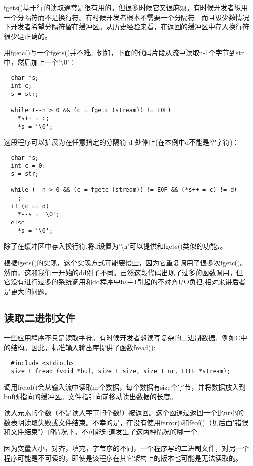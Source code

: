 fgets()基于行的读取通常是很有用的。但很多时候它又很麻烦。有时候开发者想用一个分隔符而不是换行符。有时候开发者根本不需要一个分隔符－而且极少数情况下开发者希望分隔符留在缓冲区。从历史经验来看，在返回的缓冲区中存入换行符很少是正确的。

用fgetc()写一个fgets()并不难。例如，下面的代码片段从流中读取n-1个字节到str中，然后加上一个'\textbackslash0'：
\begin{lstlisting}
  char *s; 
  int c;
  s = str;
  
  while (--n > 0 && (c = fgetc (stream)) != EOF)
    *s++ = c;
    *s = '\0';
\end{lstlisting}

这段程序可以扩展为在任意指定的分隔符 d 处停止(在本例中d不能是空字符)：
\begin{lstlisting}
  char *s;
  int c = 0;
  s = str;
  
  while (--n > 0 && (c = fgetc (stream)) != EOF && (*s++ = c) != d)
    ;
  if (c == d)
    *--s = '\0';
  else
    *s = '\0';
\end{lstlisting}

除了在缓冲区中存入换行符,将d设置为'{\textbackslash}n'可以提供和fgets()类似的功能，。

根据fgets()的实现，这个实现方式可能要慢些，因为它重复调用了很多次fgetc()。 然而，这和我们一开始的dd例子不同。虽然这段代码出现了过多的函数调用，但它没有进行过多的系统调用和dd程序中bs＝1引起的不对齐I/O负担,相对来讲后者是更大的问题。

\subsection{读取二进制文件}

一些应用程序不只是读取字符。有时候开发者想读写复杂的二进制数据，例如C中的结构。因此，标准输入输出库提供了函数fread():
\begin{lstlisting}
  #include <stdio.h>
  size_t fread (void *buf, size_t size, size_t nr, FILE *stream);
\end{lstlisting}

调用fread()会从输入流中读取nr个数据，每个数据有size个字节，并将数据放入到buf所指向的缓冲区。文件指针向前移动读出数据的长度。

读入元素的个数（不是读入字节的个数!）被返回。这个函通过返回一个比nr小的数表明读取失败或文件结束。不幸的是，在没有使用ferror()和feof()（见后面"错误和文件结束"）的情况下，不可能知道发生了这两种情况的哪一个。

因为变量大小，对齐，填充，字节序的不同，一个程序写的二进制文件，对另一个程序可能是不可读的，即使是该程序在其它架构上的版本也可能是无法读取的。

